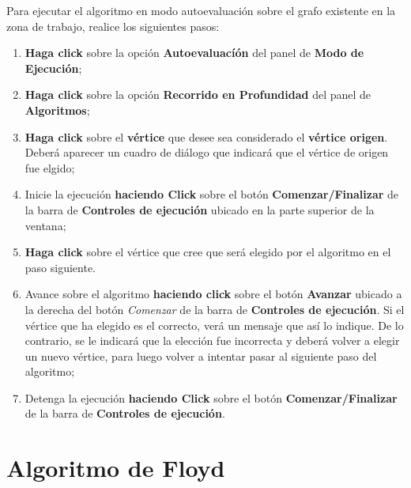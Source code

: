 \documentclass{book}
\begin{document}
Para ejecutar el algoritmo en modo autoevaluación sobre el grafo existente en la zona de trabajo, realice los siguientes pasos:
\medskip

\begin{enumerate}
	\itemsep=8pt \topsep=0pt \partopsep=0pt \parskip=0pt \parsep=0pt

	\item \textbf{Haga click} sobre la opción \textbf{Autoevaluacíón} del panel de \textbf{Modo de Ejecución};

	\item \textbf{Haga click} sobre la opción \textbf{Recorrido en Profundidad} del panel de \textbf{Algoritmos};

	\item \textbf{Haga click} sobre el \textbf{vértice} que desee sea considerado el \textbf{vértice origen}. Deberá aparecer un cuadro de diálogo que indicará que el vértice de origen fue elgido;

	\item Inicie la ejecución \textbf{haciendo Click} sobre el botón \textbf{Comenzar/Finalizar} de la barra de \textbf{Controles de ejecución} ubicado en la parte superior de la ventana;

	\item \textbf{Haga click} sobre el vértice que cree que será elegido por el algoritmo en el paso siguiente.

	\item Avance sobre el algoritmo \textbf{haciendo click} sobre el botón \textbf{Avanzar} ubicado a la derecha del botón \textit{Comenzar} de la barra de \textbf{Controles de ejecución}. Si el vértice que ha elegido es el correcto, verá un mensaje que así lo indique. De lo contrario, se le indicará que la elección fue incorrecta y deberá volver a elegir un nuevo vértice, para luego volver a intentar pasar al siguiente paso del algoritmo;

	\item Detenga la ejecución \textbf{haciendo Click} sobre el botón \textbf{Comenzar/Finalizar} de la barra de \textbf{Controles de ejecución}.

\end{enumerate}
\medskip




%
%
\chapter{Algoritmo de Floyd}


\end{document}
